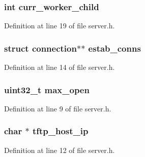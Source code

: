 \subsubsection[{\texorpdfstring{curr\+\_\+worker\+\_\+child}{curr_worker_child}}]{\setlength{\rightskip}{0pt plus 5cm}int curr\+\_\+worker\+\_\+child}\hypertarget{structserver_a47a6e54254224e795f4fea558dcfbc3a}{}\label{structserver_a47a6e54254224e795f4fea558dcfbc3a}


Definition at line 19 of file server.\+h.

\subsubsection[{\texorpdfstring{estab\+\_\+conns}{estab_conns}}]{\setlength{\rightskip}{0pt plus 5cm}struct {\bf connection}$\ast$$\ast$ estab\+\_\+conns}\hypertarget{structserver_aa7312b497a8b28d32a2f854e73564342}{}\label{structserver_aa7312b497a8b28d32a2f854e73564342}


Definition at line 14 of file server.\+h.

\subsubsection[{\texorpdfstring{max\+\_\+open}{max_open}}]{\setlength{\rightskip}{0pt plus 5cm}uint32\+\_\+t max\+\_\+open}\hypertarget{structserver_abea44b0a054946db9343b7af424d143c}{}\label{structserver_abea44b0a054946db9343b7af424d143c}


Definition at line 9 of file server.\+h.

\subsubsection[{\texorpdfstring{tftp\+\_\+host\+\_\+ip}{tftp_host_ip}}]{\setlength{\rightskip}{0pt plus 5cm}char $\ast$ tftp\+\_\+host\+\_\+ip}\hypertarget{structserver_a084b7a7e8a34f91c71fa99a1985f8e3a}{}\label{structserver_a084b7a7e8a34f91c71fa99a1985f8e3a}


Definition at line 12 of file server.\+h.

